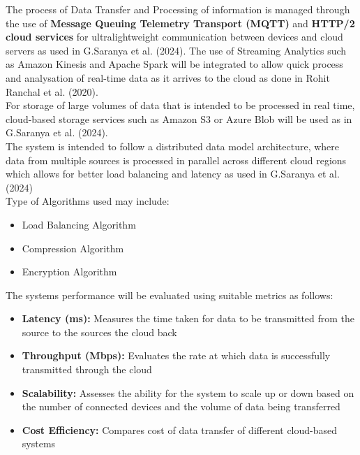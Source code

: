 \documentclass[12pt,a4paper]{article}
\begin{document}
The process of Data Transfer and Processing of information is managed through the use of \textbf{Message Queuing Telemetry Transport (MQTT)} and \textbf{HTTP/2 cloud services} for ultralightweight communication between devices and cloud servers as used in G.Saranya et al. (2024). The use of Streaming Analytics such as Amazon Kinesis and Apache Spark will be integrated to allow quick process and analysation of real-time data as it arrives to the cloud as done in Rohit Ranchal et al. (2020). \\

For storage of large volumes of data that is intended to be processed in real time, cloud-based storage services such as Amazon S3 or Azure Blob will be used as in G.Saranya et al. (2024). \\

The system is intended to follow a distributed data model architecture, where data from multiple sources is processed in parallel across different cloud regions which allows for better load balancing and latency as used in G.Saranya et al. (2024) \\

Type of Algorithms used may include: 

\begin{itemize}
    \item Load Balancing Algorithm 

    \item Compression Algorithm 

    \item Encryption Algorithm 
\end{itemize}

The systems performance will be evaluated using suitable metrics as follows:

\begin{itemize}
    \item \textbf{Latency (ms):} Measures the time taken for data to be transmitted from the source to the sources the cloud back 

    \item \textbf{Throughput (Mbps):} Evaluates the rate at which data is successfully transmitted through the cloud 

    \item \textbf{Scalability:} Assesses the ability for the system to scale up or down based on the number of connected devices and the volume of data being transferred 

    \item \textbf{Cost Efficiency:} Compares cost of data transfer of different cloud-based systems
\end{itemize}
\end{document}
